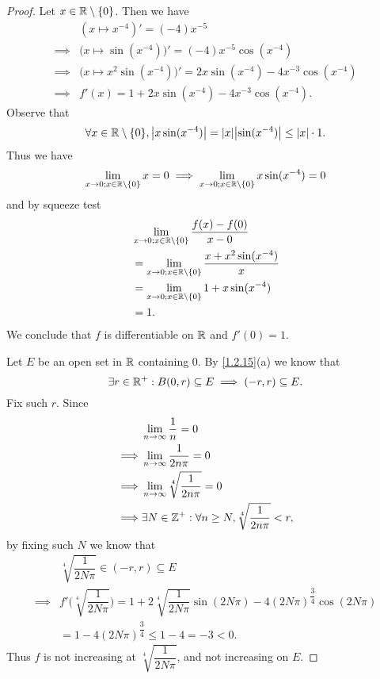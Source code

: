 \begin{proof}
  Let \(x \in \mathbb{R} \setminus \left\lbrace0\right\rbrace\).
  Then we have
  \begin{align*}
             & (x \mapsto x^{-4})' = (-4) x^{-5}                                               \\
    \implies & \big(x \mapsto \sin(x^{-4})\big)' = (-4) x^{-5} \cos(x^{-4})                    \\
    \implies & \big(x \mapsto x^2 \sin(x^{-4})\big)' = 2x \sin(x^{-4}) - 4 x^{-3} \cos(x^{-4}) \\
    \implies & f'(x) = 1 + 2 x \sin(x^{-4}) - 4 x^{-3} \cos(x^{-4}).
  \end{align*}
  Observe that
  \[
    \forall x \in \R \setminus \set{0}, \abs{x \sin(x^{-4})} = \abs{x} \abs{\sin(x^{-4})} \leq \abs{x} \cdot 1.
  \]
  Thus we have
  \[
    \lim_{x \to 0 ; x \in \mathbb{R} \setminus \left\lbrace0\right\rbrace} x = 0 \implies \lim_{x \to 0 ; x \in \mathbb{R} \setminus \left\lbrace0\right\rbrace} x \sin(x^{-4}) = 0
  \]
  and by squeeze test
  \begin{align*}
     & \lim_{x \to 0 ; x \in \mathbb{R} \setminus \left\lbrace0\right\rbrace} \dfrac{f(x) - f(0)}{x - 0}        \\
     & = \lim_{x \to 0 ; x \in \mathbb{R} \setminus \left\lbrace0\right\rbrace} \dfrac{x + x^2 \sin(x^{-4})}{x} \\
     & = \lim_{x \to 0 ; x \in \mathbb{R} \setminus \left\lbrace0\right\rbrace} 1 + x \sin(x^{-4})              \\
     & = 1.
  \end{align*}
  We conclude that \(f\) is differentiable on \(\mathbb{R}\) and \(f'(0) = 1\).

  Let \(E\) be an open set in \(\mathbb{R}\) containing \(0\).
  By \cref{1.2.15}(a) we know that
  \[
    \exists r \in \mathbb{R}^+ : B(0, r) \subseteq E \implies (-r, r) \subseteq E.
  \]
  Fix such \(r\).
  Since
  \begin{align*}
             & \lim_{n \to \infty} \dfrac{1}{n} = 0                                     \\
    \implies & \lim_{n \to \infty} \dfrac{1}{2 n \pi} = 0                               \\
    \implies & \lim_{n \to \infty} \sqrt[4]{\dfrac{1}{2 n \pi}} = 0                     \\
    \implies & \exists N \in \mathbb{Z}^+ : \forall n \geq N, \sqrt[4]{\dfrac{1}{2 n \pi}} < r,
  \end{align*}
  by fixing such \(N\) we know that
  \begin{align*}
             & \sqrt[4]{\dfrac{1}{2 N \pi}} \in (-r, r) \subseteq E                                                                                     \\
    \implies & f'\bigg(\sqrt[4]{\dfrac{1}{2 N \pi}}\bigg) = 1 + 2 \sqrt[4]{\dfrac{1}{2 N \pi}} \sin(2 N \pi) - 4 (2 N \pi)^{\dfrac{3}{4}} \cos(2 N \pi) \\
             & = 1 - 4 (2 N \pi)^{\dfrac{3}{4}} \leq 1 - 4 = -3 < 0.
  \end{align*}
  Thus \(f\) is not increasing at \(\sqrt[4]{\dfrac{1}{2 N \pi}}\), and not increasing on \(E\).
\end{proof}

